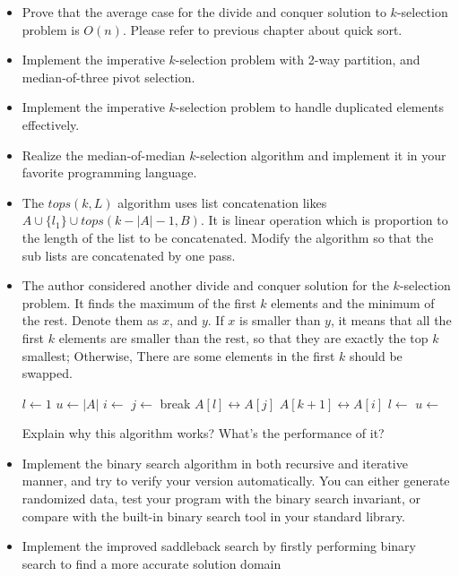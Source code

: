 \documentclass[UTF8]{article}
\begin{document}
\begin{Exercise}
\begin{itemize}
\item Prove that the average case for the divide and conquer solution to $k$-selection problem is $O(n)$. Please refer to previous chapter about quick sort.
\item Implement the imperative $k$-selection problem with 2-way partition, and median-of-three pivot selection.
\item Implement the imperative $k$-selection problem to handle duplicated elements effectively.
\item Realize the median-of-median $k$-selection algorithm and implement it in your favorite programming language.
\item The $tops(k, L)$ algorithm uses list concatenation likes $A \cup \{ l_1 \} \cup tops(k - |A| - 1, B)$. It is linear operation which is proportion to the length of the list to be concatenated. Modify the algorithm so that the sub lists are concatenated by one pass.
\item The author considered another divide and conquer solution for the $k$-selection problem. It finds the maximum of the
first $k$ elements and the minimum of the rest. Denote them as $x$, and $y$. If $x$ is smaller than $y$, it means that
all the first $k$ elements are smaller than the rest, so that they are exactly the top $k$ smallest; Otherwise, There are
some elements in the first $k$ should be swapped.
\begin{algorithmic}[1]
  \State $l \gets 1$
  \State $u \gets |A|$
  \Loop
    \State $i \gets$ 
    \State $j \gets$ 
      \State break
    \EndIf
    \State {} $A[l] \leftrightarrow A[j]$
    \State {} $A[k+1] \leftrightarrow A[i]$
    \State $l \gets$ 
    \State $u \gets$ 
  \EndLoop
\EndProcedure
\end{algorithmic}
Explain why this algorithm works? What's the performance of it?
\item Implement the binary search algorithm in both recursive and iterative manner, and try to verify your version
automatically. You can either generate randomized data, test your program with the binary search invariant, or compare with the built-in binary search tool in your standard library.
\item Implement the improved saddleback search by firstly performing binary search to find a more accurate solution domain

\end{itemize}
\end{Exercise}
\end{document}
